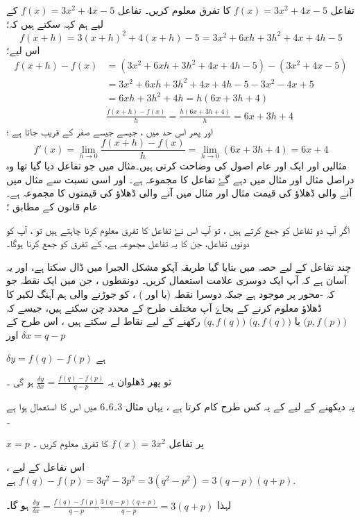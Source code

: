 تفاعل \(f(x)=3x^2+4x-5\) کا تفرق معلوم کریں۔
تفاعل \(f(x)=3x^2+4x-5\) کے لیے ہم کہہ سکتے ہیں کہ؛\[f(x+h)=3(x+h)^2+4(x+h)-5=3x^2+6xh+3h^2+4x+4h-5\]
اس لیے؛ 
\begin{align}
f(x+h)-f(x)&=(3x^2+6xh+3h^2+4x+4h-5)-(3x^2+4x-5)\\
&=3x^2+6xh+3h^2+4x+4h-5-3x^2-4x+5\\
&=6xh+3h^2+4h=h(6x+3h+4)\\
&\frac{f(x+h)-f(x)}{h}=\frac{h(6x+3h+4)}{h}=6x+3h+4
\end{align}
 اور پھر اس حد میں ، جیسے جیسے   صفر کے قریب جاتا ہے ؛ 
\[f'(x)=\lim_{h \to 0}\frac{f(x+h)-f(x)}{h}=\lim_{h \to 0} (6x+3h+4)=6x+4 \]
مثالیں    اور    ایک اور عام اصول کی وضاحت کرتی ہیں۔مثال    میں جو تفاعل دیا گیا تھا وہ دراصل مثال    اور مثال     میں دہے گۓ تفاعل کا مجموعہ ہے۔ اور اسی نسبت سے   مثال    میں آنے والی ڈھلاؤ کی قیمت مثال   اور مثال    میں آنے والی ڈھلاؤ کی قیمتوں کا مجموعہ ہے۔
 عام قانون کے مطابق ؛
 
اگر آپ دو تفاعل کو جمع کرتے ہیں ، تو آپ اس نۓ تفاعل کا تفرق معلوم کرنا چاہتے ہیں تو ، آپ کو دونوں تفاعل، جن کا یہ تفاعل مجموعہ ہے، کے تفرق کو جمع کرنا ہوگا۔

چند تفاعل کے لیے حصہ   میں بتایا گیا طریقہ آپکو مشکل الجبرا میں ڈال سکتا ہے، اور یہ آسان ہے کہ آپ ایک دوسری علامت استعمال کریں۔  دونقطوں ، جن میں ایک نقطہ  جو کہ  -محور پر موجود ہے جبکہ دوسرا نقطہ    (یا     اور    ) ، کو جوڑنے والی ہم آہنگ لکیر کا ڈھلاؤ معلوم کرنے کے بجاۓ آپ مختلف طرح کے محدد چن سکتے ہیں، جیسے کہ  \(\big( p,f(p) \big)\) یا \(\big( q,f(q) \big)\)
\(\big( q,f(q) \big)\) رکھنے کے لیے نقاط لے سکتے ہیں ،  اس طرح کے \(\delta x=q-p\) اور 

\(\delta y =f(q)-f(p)\) ہے   

تو پھر ڈھلوان یہ \(\frac{\delta y}{\delta x}=\frac{f(q)-f(p)}{q-p}\) ہو گی ۔ 

یہ دیکھنے کے لیے کے یہ کس طرح کام کرتا ہے ، یہاں مثال 3۔6۔6 میں   اس کا استعمال ہوا ہے ۔ 


\(x=p\) پر تفاعل \(f(x)=3x^2\) کا تفرق معلوم کریں ۔ 

اس تفاعل کے لیے ، \(f(q)-f(p)=3q^2-3p^2=3(q^2-p^2)=3(q-p)(q+p)\) ہے.


لہذا  \(\frac{\delta y}{\delta x}=\frac{f(q)-f(p)}{q-p}\frac{3(q-p)(q+p)}{q-p}=3(q+p)\) ہو گا۔ 
  
